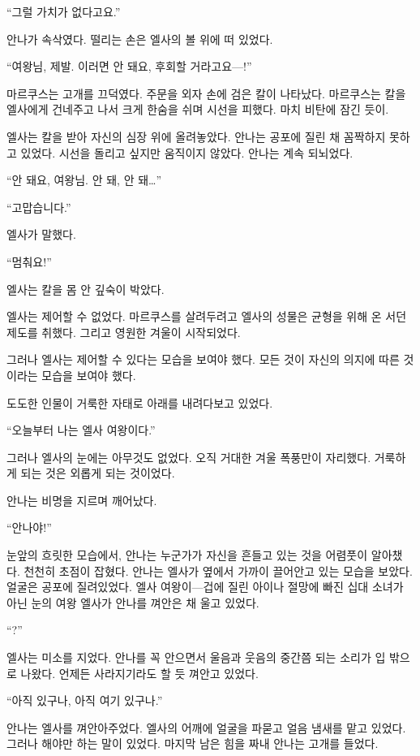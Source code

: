 ``그럴 가치가 없다고요.''

안나가 속삭였다. 떨리는 손은 엘사의 볼 위에 떠 있었다.

``여왕님, 제발. 이러면 안 돼요, 후회할 거라고요—!''

마르쿠스는 고개를 끄덕였다. 주문을 외자 손에 검은 칼이 나타났다. 마르쿠스는 칼을 엘사에게 건네주고 나서 크게 한숨을 쉬며 시선을 피했다. 마치 비탄에 잠긴 듯이.

엘사는 칼을 받아 자신의 심장 위에 올려놓았다. 안나는 공포에 질린 채 꼼짝하지 못하고 있었다. 시선을 돌리고 싶지만 움직이지 않았다. 안나는 계속 되뇌었다.

``안 돼요, 여왕님. 안 돼, 안 돼\ldots''

``고맙습니다.''

엘사가 말했다.

``멈춰요!''

엘사는 칼을 몸 안 깊숙이 박았다.

\textbreak

엘사는 제어할 수 없었다. 마르쿠스를 살려두려고 엘사의 성물은 균형을 위해 온 서던 제도를 취했다. 그리고 영원한 겨울이 시작되었다.

그러나 엘사는 제어할 수 있다는 모습을 보여야 했다. 모든 것이 자신의 의지에 따른 것이라는 모습을 보여야 했다.

도도한 인물이 거룩한 자태로 아래를 내려다보고 있었다.

``오늘부터 나는 엘사 여왕이다.''

그러나 엘사의 눈에는 아무것도 없었다. 오직 거대한 겨울 폭풍만이 자리했다. 거룩하게 되는 것은 외롭게 되는 것이었다.

\textbreak

안나는 비명을 지르며 깨어났다.

``안나야!''

눈앞의 흐릿한 모습에서, 안나는 누군가가 자신을 흔들고 있는 것을 어렴풋이 알아챘다. 천천히 초점이 잡혔다. 안나는 엘사가 옆에서 가까이 끌어안고 있는 모습을 보았다. 얼굴은 공포에 질려있었다. 엘사 여왕이—겁에 질린 아이나 절망에 빠진 십대 소녀가 아닌 눈의 여왕 엘사가 안나를 껴안은 채 울고 있었다.

``?''

엘사는 미소를 지었다. 안나를 꼭 안으면서 울음과 웃음의 중간쯤 되는 소리가 입 밖으로 나왔다. 언제든 사라지기라도 할 듯 껴안고 있었다.

``아직 있구나, 아직 여기 있구나.''

안나는 엘사를 껴안아주었다. 엘사의 어깨에 얼굴을 파묻고 얼음 냄새를 맡고 있었다. 그러나 해야만 하는 말이 있었다. 마지막 남은 힘을 짜내 안나는 고개를 들었다.

